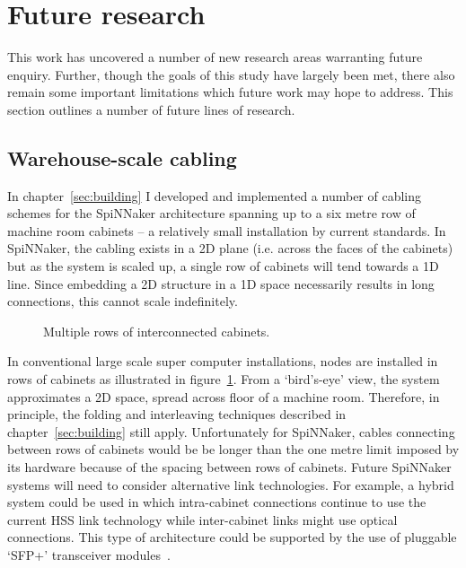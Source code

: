 	\section{Future research}
		
		This work has uncovered a number of new research areas warranting future
		enquiry. Further, though the goals of this study have largely been met,
		there also remain some important limitations which future work may hope to
		address.  This section outlines a number of future lines of research.
		
		\subsection{Warehouse-scale cabling}
			
			In chapter~\ref{sec:building} I developed and implemented a number of
			cabling schemes for the SpiNNaker architecture spanning up to a six metre
			row of machine room cabinets -- a relatively small installation by
			current standards. In SpiNNaker, the cabling exists in a 2D plane (i.e.
			across the faces of the cabinets) but as the system is scaled up, a
			single row of cabinets will tend towards a 1D line. Since embedding a 2D
			structure in a 1D space necessarily results in long connections, this
			cannot scale indefinitely.
			
			\begin{figure}
				\center
				
				\caption{Multiple rows of interconnected cabinets.}
				\label{fig:multi-row-cabling}
			\end{figure}
			
			In conventional large scale super computer installations, nodes are
			installed in rows of cabinets as illustrated in
			figure~\ref{fig:multi-row-cabling}.  From a `bird's-eye' view, the system
			approximates a 2D space, spread across floor of a machine room.
			Therefore, in principle, the folding and interleaving techniques
			described in chapter~\ref{sec:building} still apply. Unfortunately for
			SpiNNaker, cables connecting between rows of cabinets would be be longer
			than the one metre limit imposed by its hardware because of the spacing
			between rows of cabinets.  Future SpiNNaker systems will need to consider
			alternative link technologies.  For example, a hybrid system could be
			used in which intra-cabinet connections continue to use the current HSS
			link technology while inter-cabinet links might use optical connections.
			This type of architecture could be supported by the use of pluggable
			`SFP+' transceiver modules~\cite{sff01}.
		
